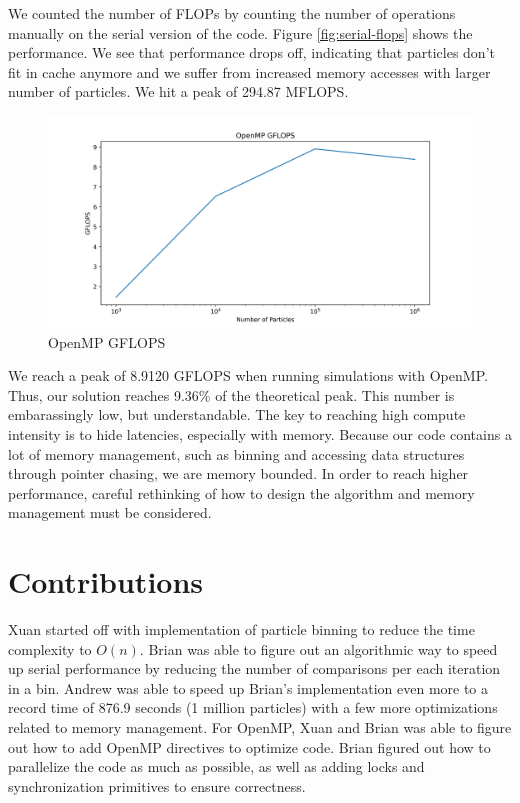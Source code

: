 \documentclass{article}
\begin{document}
We counted the number of FLOPs by counting the number of operations manually on the serial version of the code. Figure \ref{fig:serial-flops} shows the performance. We see that performance drops off, indicating that particles don't fit in cache anymore and we suffer from increased memory accesses with larger number of particles. We hit a peak of 294.87 MFLOPS.

\begin{figure}[H]
	\centering
	\includegraphics[width=6in]{figures/openmp_flops.png}
	\caption{OpenMP GFLOPS}
	\label{fig:openmp-flops}
\end{figure}

We reach a peak of 8.9120 GFLOPS when running simulations with OpenMP. Thus, our solution reaches 9.36\% of the theoretical peak. This number is embarassingly low, but understandable. The key to reaching high compute intensity is to hide latencies, especially with memory. Because our code contains a lot of memory management, such as binning and accessing data structures through pointer chasing, we are memory bounded. In order to reach higher performance, careful rethinking of how to design the algorithm and memory management must be considered.

\section{Contributions}
Xuan started off with implementation of particle binning to reduce the time complexity to $O(n)$. Brian was able to figure out an algorithmic way to speed up serial performance by reducing the number of comparisons per each iteration in a bin. Andrew was able to speed up Brian's implementation even more to a record time of 876.9 seconds (1 million particles) with a few more optimizations related to memory management. For OpenMP, Xuan and Brian was able to figure out how to add OpenMP directives to optimize code. Brian figured out how to parallelize the code as much as possible, as well as adding locks and synchronization primitives to ensure correctness.



\end{document}
